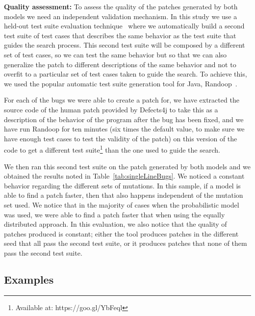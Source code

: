 \documentclass[conference]{IEEEtran}
\begin{document}
\textbf{Quality assessment:}
To assess the quality of the patches generated by both models we need an
independent validation mechanism. In this study we use a held-out test suite 
evaluation technique~\cite{legoues2012,Smith15} where we automatically build a second
test suite of test cases that describes the same behavior as the test suite that
guides the search process. This second test suite will be composed by a
different set of test cases, so we can test the same behavior but so that we can
also generalize the patch to different descriptions of the same behavior and not
to overfit to a particular set of test cases taken to guide the search. To
achieve this, we used the popular automatic test suite generation tool for Java,
Randoop~\cite{pacheco07}. 

For each of the bugs we were able to create a patch for, we have
extracted
the source code of the human patch provided by Defects4j to take this as a
description of the behavior of the program after the bug has been fixed, and we
have run Randoop for ten minutes (six times the default value, to make sure we
have enough test cases to test the validity of the patch) on this version of the
code to get a different test suite\footnote{Available at: https://goo.gl/YbFeql}
than the one used to guide the search.  

We then ran this second test suite on the patch generated by both models and we
obtained the results noted in Table~\ref{tab:singleLineBugs}. We noticed a
constant behavior regarding the different sets of mutations. In this sample, if
a model is able to find a patch faster, then that also happens independent of
the mutation set used. We notice that in the majority of cases when the
probabilistic model was used, we were able to find a patch faster that when
using the equally distributed approach. In this evaluation, we also notice that
the quality of patches produced is constant; either the tool produces patches in
the different seed that all pass the second test suite, or it produces patches
that none of them pass the second test suite.  


\subsection{Examples} \label{examPatches}
\end{document}
